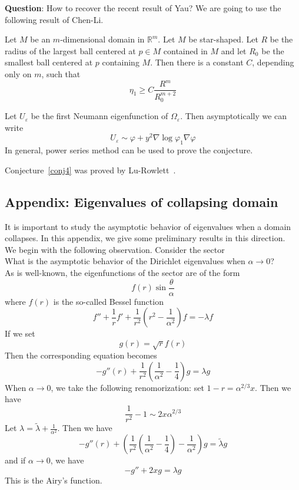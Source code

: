 \textbf{Question}: How to recover the recent result of Yau? We are going to use
the following result of Chen-Li.

\begin{theorem}
Let $M$ be an $m$-dimensional domain in $\mathbb{R}^m$. Let $M$ be star-shaped.
Let $R$ be the radius of the largest ball centered at $p\in M$ contained in $M$
and let $R_0$ be the smallest ball centered at $p$ containing $M$. Then there is
a constant $C$, depending only on $m$, such that
\[
\eta_1 \geqslant C\frac{R^m}{R_0^{m+2}}
\]
\end{theorem}

Let $U_\varepsilon$ be the first Neumann
eigenfunction of $\Omega_\varepsilon$. Then asymptotically we can write
\[
U_\varepsilon \sim \varphi + y^2 \nabla\log \varphi_1 \nabla\varphi
\]
In general, power series method can be used to prove the conjecture.

\begin{remark} Conjecture~\ref{conj4} was proved by Lu-Rowlett~\cite{lu-rowlett}.
\end{remark}

\subsection*{Appendix: Eigenvalues of collapsing domain}

It is important to study the asymptotic behavior of eigenvalues when a domain
collapses. In this appendix, we give some preliminary results in this direction.
\\

We begin with the following observation. Consider the sector
\\%
What is the asymptotic behavior of the Dirichlet eigenvalues when
$\alpha\rightarrow 0$?
\\

As is well-known, the eigenfunctions of the sector are of the form
\[
f(r)\sin\frac{\theta}{\alpha}
\]
where $f(r)$ is the so-called Bessel function
\[
f'' + \frac{1}{r}f' + \frac{1}{r^2}(r^2 - \frac{1}{\alpha^2})f = -\lambda f
\]
If we set
\[
g(r) = \sqrt{r} f(r)
\]
Then the corresponding equation becomes
\[
-g''(r) + \frac{1}{r^2}(\frac{1}{\alpha^2}-\frac{1}{4})g = \lambda g
\]
When $\alpha\rightarrow 0$, we take the following renomorization:
set $1 - r = \alpha^{2/3}x$. Then we have
\[
\frac{1}{r^2} - 1 \sim 2x\alpha^{2/3}
\]
Let $\lambda = \widetilde\lambda + \frac{1}{\alpha^2}$. Then we have
\[
-g''(r) + \left(\frac{1}{r^2}\left(\frac{1}{\alpha^2}-\frac{1}{4}\right)-
\frac{1}{\alpha^2}\right)g
= \widetilde\lambda g
\]
and if $\alpha\rightarrow 0$, we have
\[
-g'' + 2xg = \lambda g
\]
This is the Airy's function.
\\


